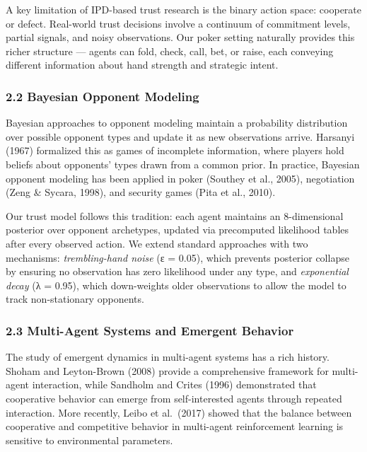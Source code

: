 \documentclass[
]{article}
\begin{document}
A key limitation of IPD-based trust research is the binary action space:
cooperate or defect. Real-world trust decisions involve a continuum of
commitment levels, partial signals, and noisy observations. Our poker
setting naturally provides this richer structure --- agents can fold,
check, call, bet, or raise, each conveying different information about
hand strength and strategic intent.

\hypertarget{bayesian-opponent-modeling}{%
\subsubsection{2.2 Bayesian Opponent
Modeling}\label{bayesian-opponent-modeling}}

Bayesian approaches to opponent modeling maintain a probability
distribution over possible opponent types and update it as new
observations arrive. Harsanyi (1967) formalized this as games of
incomplete information, where players hold beliefs about opponents'
types drawn from a common prior. In practice, Bayesian opponent modeling
has been applied in poker (Southey et al., 2005), negotiation (Zeng \&
Sycara, 1998), and security games (Pita et al., 2010).

Our trust model follows this tradition: each agent maintains an
8-dimensional posterior over opponent archetypes, updated via
precomputed likelihood tables after every observed action. We extend
standard approaches with two mechanisms: \emph{trembling-hand noise} (ε
= 0.05), which prevents posterior collapse by ensuring no observation
has zero likelihood under any type, and \emph{exponential decay} (λ =
0.95), which down-weights older observations to allow the model to track
non-stationary opponents.

\hypertarget{multi-agent-systems-and-emergent-behavior}{%
\subsubsection{2.3 Multi-Agent Systems and Emergent
Behavior}\label{multi-agent-systems-and-emergent-behavior}}

The study of emergent dynamics in multi-agent systems has a rich
history. Shoham and Leyton-Brown (2008) provide a comprehensive
framework for multi-agent interaction, while Sandholm and Crites (1996)
demonstrated that cooperative behavior can emerge from self-interested
agents through repeated interaction. More recently, Leibo et al.~(2017)
showed that the balance between cooperative and competitive behavior in
multi-agent reinforcement learning is sensitive to environmental
parameters.
\end{document}
